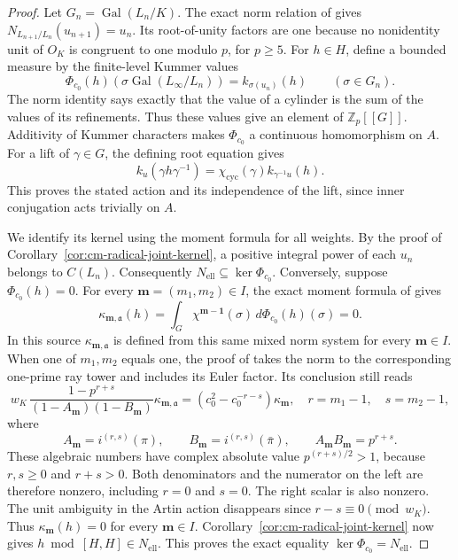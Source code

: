 \documentclass[11pt]{article}
\theoremstyle{definition}\newtheorem{definition}[theorem]{Definition}
\begin{document}
\begin{proof}
Let \(G_n=\operatorname{Gal}(L_n/K)\).  The exact norm relation
of \cite[Proposition 2.5, p.~8]{IshiiSoule} gives
\(N_{L_{n+1}/L_n}(u_{n+1})=u_n\).  Its root-of-unity factors are
one because no nonidentity unit of \(O_K\) is congruent to one
modulo \(p\), for \(p\geq5\).
For \(h\in H\), define a bounded measure by the finite-level
Kummer values
\begin{equation}\label{eq:cm-mixed-measure}
 \Phi_{c_0}(h)(\sigma\operatorname{Gal}(L_\infty/L_n))
                      =k_{\sigma(u_n)}(h)\qquad(\sigma\in G_n).
\end{equation}
The norm identity says exactly that the value of a cylinder is
the sum of the values of its refinements.  Thus these values give
an element of \(\mathbb Z_p[[G]]\).  Additivity of Kummer characters
makes \(\Phi_{c_0}\) a continuous homomorphism on \(A\).
For a lift of \(\gamma\in G\), the defining root equation gives
\[
 k_u(\gamma h\gamma^{-1})
   =\chi_{\mathrm{cyc}}(\gamma)k_{\gamma^{-1}u}(h).
\]
This proves the stated action and its independence of the lift,
since inner conjugation acts trivially on \(A\).

We identify its kernel using the moment formula for all weights.  By the proof of
Corollary~\ref{cor:cm-radical-joint-kernel}, a positive integral
power of each \(u_n\) belongs to \(C(L_n)\).  Consequently
\(N_{\mathrm{ell}}\subseteq\ker\Phi_{c_0}\).
Conversely, suppose \(\Phi_{c_0}(h)=0\).
For every \(\boldsymbol m=(m_1,m_2)\in I\), the exact moment
formula of \cite[Lemma 4.2, p.~17]{IshiiSoule} gives
\[
 \kappa_{\boldsymbol m,\mathfrak a}(h)
   =\int_G\chi^{\boldsymbol m-\boldsymbol1}(\sigma)\,
                                 d\Phi_{c_0}(h)(\sigma)=0.
\]
In this source \(\kappa_{\boldsymbol m,\mathfrak a}\) is defined
from this same mixed norm system for every \(\boldsymbol m\in I\).
When one of \(m_1,m_2\) equals one, the proof of
\cite[Proposition 4.3, pp.~17--18]{IshiiSoule} takes the norm
to the corresponding one-prime ray tower and includes its Euler
factor.  Its conclusion still reads
\begin{equation}\label{eq:cm-mixed-all-weight-scalar}
 w_K\,\frac{1-p^{r+s}}{(1-A_{\boldsymbol m})(1-B_{\boldsymbol m})}
       \kappa_{\boldsymbol m,\mathfrak a}
    =(c_0^2-c_0^{-r-s})\kappa_{\boldsymbol m},
 \quad r=m_1-1,\quad s=m_2-1,
\end{equation}
where
\[
 A_{\boldsymbol m}=i^{(r,s)}(\pi),\qquad
 B_{\boldsymbol m}=i^{(r,s)}(\bar\pi),\qquad
 A_{\boldsymbol m}B_{\boldsymbol m}=p^{r+s}.
\]
These algebraic numbers have complex absolute value
\(p^{(r+s)/2}>1\), because \(r,s\geq0\) and \(r+s>0\).
Both denominators and the numerator on the left are therefore
nonzero, including \(r=0\) and \(s=0\).
The right scalar is also nonzero.  The unit ambiguity in the
Artin action disappears since \(r-s\equiv0\pmod{w_K}\).
Thus \(\kappa_{\boldsymbol m}(h)=0\) for every
\(\boldsymbol m\in I\).
Corollary~\ref{cor:cm-radical-joint-kernel} now gives
\(h\bmod[H,H]\in N_{\mathrm{ell}}\).
This proves the exact equality
\(\ker\Phi_{c_0}=N_{\mathrm{ell}}\).


\end{proof}
\end{document}
